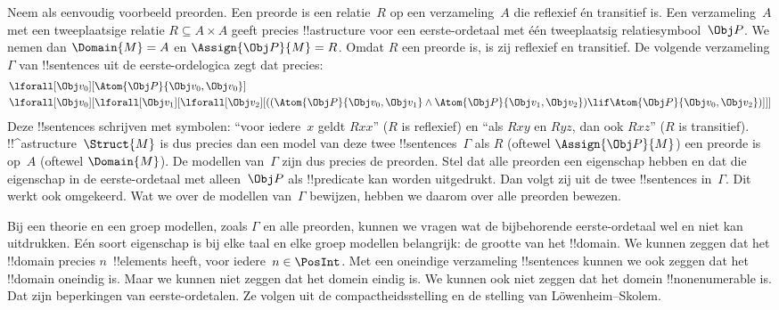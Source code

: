 \documentclass[openany]{memoir}
\begin{document}
Neem als eenvoudig voorbeeld preorden. Een preorde is een relatie~$R$
op een verzameling~$A$ die reflexief én transitief is. Een
verzameling~$A$ met een tweeplaatsige relatie
$R \subseteq A \times A$ geeft precies !!a{structure} voor een
eerste-ordetaal met één tweeplaatsig relatiesymbool~$\Obj P$. We nemen
dan $\Domain{M} = A$ en $\Assign{\Obj P}{M} = R$. Omdat $R$ een
preorde is, is zij reflexief en transitief. De volgende verzameling
$\Gamma$ van !!{sentence}s uit de eerste-ordelogica zegt dat precies:
\begin{align*}
  & \lforall[\Obj v_0][\Atom{\Obj P}{\Obj v_0,\Obj v_0}]\\
  & \lforall[\Obj v_0][\lforall[\Obj v_1][\lforall[\Obj v_2][((\Atom{\Obj P}{\Obj v_0,\Obj v_1} \land \Atom{\Obj P}{\Obj v_1,\Obj v_2}) \lif \Atom{\Obj P}{\Obj v_0,\Obj v_2})]]]
\end{align*}
Deze !!{sentence}s schrijven met symbolen: ``voor iedere~$x$ geldt
$Rxx$'' ($R$ is reflexief) en ``als $Rxy$ en $Ryz$, dan ook $Rxz$''
($R$ is transitief). !!^a{structure}~$\Struct{M}$ is dus precies dan
een model van deze twee !!{sentence}s~$\Gamma$ als $R$ (oftewel
$\Assign{\Obj P}{M}$) een preorde is op~$A$ (oftewel $\Domain{M}$).
De modellen van~$\Gamma$ zijn dus precies de preorden. Stel dat alle
preorden een eigenschap hebben en dat die eigenschap in de
eerste-ordetaal met alleen~$\Obj P$ als !!{predicate} kan worden
uitgedrukt. Dan volgt zij uit de twee !!{sentence}s in~$\Gamma$. Dit
werkt ook omgekeerd. Wat we over de modellen van~$\Gamma$ bewijzen,
hebben we daarom over alle preorden bewezen.

Bij een theorie en een groep modellen, zoals $\Gamma$ en alle
preorden, kunnen we vragen wat de bijbehorende eerste-ordetaal wel en
niet kan uitdrukken. Eén soort eigenschap is bij elke taal en elke
groep modellen belangrijk: de grootte van het !!{domain}. We kunnen
zeggen dat het !!{domain} precies $n$~!!{element}s heeft, voor
iedere~$n \in \PosInt$. Met een oneindige verzameling !!{sentence}s
kunnen we ook zeggen dat het !!{domain} oneindig is. Maar we kunnen
niet zeggen dat het domein eindig is. We kunnen ook niet zeggen dat het
domein !!{nonenumerable} is. Dat zijn beperkingen van eerste-ordetalen.
Ze volgen uit de compactheidsstelling en de stelling van
L\"owenheim--Skolem.
\endgroup

\begingroup
\def\olfilename{OLP-0148}
\def\olfilepath{content/first-order-logic/introduction/}
\hypertarget{unit-OLP-0148}{}
\end{document}
